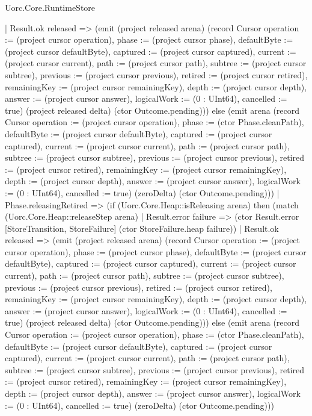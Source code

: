 \begin{lexlean}{Uorc.Core.RuntimeStore}
\begin{semanticmodule}
{      | Result.ok released => (emit (project released arena) (record Cursor {operation := (project cursor operation), phase := (project cursor phase), defaultByte := (project cursor defaultByte), captured := (project cursor captured), current := (project cursor current), path := (project cursor path), subtree := (project cursor subtree), previous := (project cursor previous), retired := (project cursor retired), remainingKey := (project cursor remainingKey), depth := (project cursor depth), answer := (project cursor answer), logicalWork := (0 : UInt64), cancelled := true}) (project released delta) (ctor Outcome.pending))) else (emit arena (record Cursor {operation := (project cursor operation), phase := (ctor Phase.cleanPath), defaultByte := (project cursor defaultByte), captured := (project cursor captured), current := (project cursor current), path := (project cursor path), subtree := (project cursor subtree), previous := (project cursor previous), retired := (project cursor retired), remainingKey := (project cursor remainingKey), depth := (project cursor depth), answer := (project cursor answer), logicalWork := (0 : UInt64), cancelled := true}) (zeroDelta) (ctor Outcome.pending)))
    | Phase.releasingRetired => (if (Uorc.Core.Heap::isReleasing arena) then (match (Uorc.Core.Heap::releaseStep arena)
      | Result.error failure => (ctor Result.error [StoreTransition, StoreFailure] (ctor StoreFailure.heap failure))
      | Result.ok released => (emit (project released arena) (record Cursor {operation := (project cursor operation), phase := (project cursor phase), defaultByte := (project cursor defaultByte), captured := (project cursor captured), current := (project cursor current), path := (project cursor path), subtree := (project cursor subtree), previous := (project cursor previous), retired := (project cursor retired), remainingKey := (project cursor remainingKey), depth := (project cursor depth), answer := (project cursor answer), logicalWork := (0 : UInt64), cancelled := true}) (project released delta) (ctor Outcome.pending))) else (emit arena (record Cursor {operation := (project cursor operation), phase := (ctor Phase.cleanPath), defaultByte := (project cursor defaultByte), captured := (project cursor captured), current := (project cursor current), path := (project cursor path), subtree := (project cursor subtree), previous := (project cursor previous), retired := (project cursor retired), remainingKey := (project cursor remainingKey), depth := (project cursor depth), answer := (project cursor answer), logicalWork := (0 : UInt64), cancelled := true}) (zeroDelta) (ctor Outcome.pending)))
}
\end{semanticmodule}
\end{lexlean}
